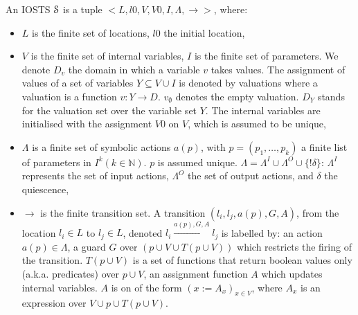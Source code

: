 \begin{definition}[IOSTS]
An IOSTS $\EuScript{S}$ is a tuple $<
L,l0,V,V0,I,\Lambda,\rightarrow>$, where:

\begin{itemize}
\item $L$ is the finite set of locations, $l0$ the initial
location,

\item $V$ is the finite set of internal variables, $I$ is the
finite set of parameters. We denote $D_v$ the domain in which a
variable $v$ takes values. The assignment of values of a set of
variables $Y \subseteq V \cup I$ is denoted by valuations where a
valuation is a function $v: Y \rightarrow D$. $v_\emptyset$
denotes the empty valuation. $D_Y$ stands for the valuation set
over the variable set $Y$. The internal variables are initialised
with the assignment $V0$ on $V$, which is assumed to be unique,

\item $\Lambda$ is a finite set of symbolic actions $a(p)$, with
$p = (p_1,\dots,p_k)$ a finite list of parameters in $I^k(k \in
\mathbb{N})$. $p$ is assumed unique. $\Lambda= \Lambda^I  \cup
\Lambda^O \cup \{!\delta \}$: $\Lambda^I$ represents the set of
input actions, $\Lambda^O$ the set of output actions, and
$\delta$ the quiescence,

\item $\rightarrow$ is the finite transition set. A transition
$(l_i,l_j,a(p),G,A)$, from the location $l_i \in L$ to $l_j \in
L$, denoted $l_i \xrightarrow{a(p),G,A} l_j$ is labelled by: an
action $a(p) \in \Lambda$, a guard  $G$ over $(p \cup V \cup T(p
\cup V))$ which restricts the firing of the transition. $T(p \cup
V)$ is a set of functions that return boolean values only (a.k.a.
predicates) over $p \cup V$, an assignment function $A$ which
updates internal variables. $A$ is on of the form $(x:=A_x)_{x\in
V}$, where $A_x$ is an expression over $V \cup p \cup T(p \cup
V)$.
\end{itemize}

\end{definition}

